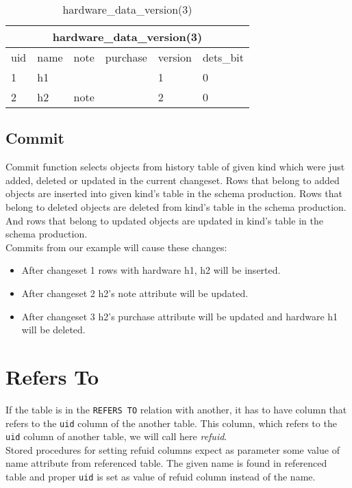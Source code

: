 \documentclass[deska]{subfiles}
\begin{document}
\begin{center}

\begin{table}
    \caption{hardware\_data\_version(3)}
    \label{tab-select-hardware-v3}
\begin{tabular}{ | l | l | l | l | l | l |}
    \hline
    \multicolumn{6}{|c|}{hardware\_data\_version(3)}\\
    \hline
    uid & name & note & purchase & version & dets\_bit\\
    \hline
    1 & h1 &  &  & 1 & 0\\
    2 & h2 & note &  & 2 & 0\\
    \hline
\end{tabular}
\end{table}

\end{center}

\subsection{Commit}
Commit function selects objects from history table of given kind which were just added, deleted or updated in the current changeset. Rows that belong to added objects are inserted into given kind's table in the schema production. Rows that belong to deleted objects are deleted from kind's table in the schema production. And rows that belong to updated objects are updated in kind's table in the schema production.\\
Commits from our example will cause these changes:
\begin{itemize}
    \item After changeset 1 rows with hardware h1, h2 will be inserted.
    \item After changeset 2 h2's note attribute will be updated.
    \item After changeset 3 h2's purchase attribute will be updated and hardware h1 will be deleted.
\end{itemize}

\section{Refers To}
\label{sec:db-refs-to}
If the table is in the {\tt REFERS TO} relation with another, it has to have column that refers to the {\tt uid} column of the another table. This column, which refers to the {\tt uid} column of another table, we will call here {\em refuid}.\\
Stored procedures for setting refuid columns expect as parameter some value of name attribute from referenced table. The given name is found in referenced table and proper {\tt uid} is set as value of refuid column instead of the name.
\end{document}

